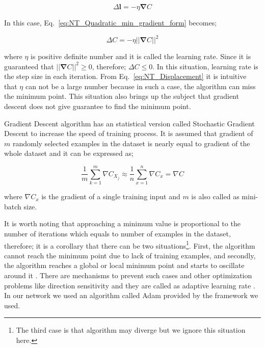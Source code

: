 \documentclass[a4paper,times,hidelinks,12pt]{article}
\begin{document}
\begin{equation}
\label{eq:NT_learning_rate}
\Delta{\boldsymbol{l}} = -\eta\boldsymbol{\nabla}C
\end{equation}

\noindent In this case, Eq.~\eqref{eq:NT_Quadratic_min_gradient_form} becomes;

\begin{equation}
\label{eq:NT_Displacement}
\Delta{C} = -\eta ||\boldsymbol{\nabla}{C}||^2
\end{equation}

\noindent where $\eta$ is positive definite number and it is called the learning rate. Since it is guaranteed that $||\boldsymbol{\nabla}{C}||^2 \geq 0$, therefore; $\Delta{C} \leq 0$. In this situation, learning rate is the step size in each iteration. From Eq.~\eqref{eq:NT_Displacement} it is intuitive that $\eta$ can not be a large number because in such a case, the algorithm can miss the minimum point. This situation also brings up the subject that gradient descent does not give guarantee to find the minimum point.

Gradient Descent algorithm has an statistical version called Stochastic Gradient Descent to increase the speed of training process. It is assumed that gradient of  $m$ randomly selected examples in the dataset is nearly equal to gradient of the whole dataset and it can be expressed as;

\begin{equation}
\label{eq:NT_Stochastic}
\frac{1}{m} \sum\limits_{k = 1}^{m} \nabla{C_{X_j}} \approx \frac{1}{n}\sum\limits_{x = 1}^{n} \nabla{C_{x}} = \nabla{C}
\end{equation}

\noindent where $\nabla{C_x}$ is the gradient of a single training input and $m$ is also called as mini-batch size.

It is worth noting that approaching a minimum value is proportional to the number of iterations which equals to number of examples in the dataset, therefore; it is a corollary that there can be two situations\footnote{The third case is that algorithm may diverge but we ignore this situation here.}. First, the algorithm cannot reach the minimum point due to lack of training examples, and secondly, the algorithm reaches a global or local minimum point and starts to oscillate around it \cite{zeiler2012adadelta}. There are mechanisms to prevent such cases and other optimization problems like direction sensitivity and they are called as adaptive learning rate \cite{mills2017deep}. In our network we used an algorithm called Adam \cite{kingma2014adam} provided by the framework we used.  
\end{document}
